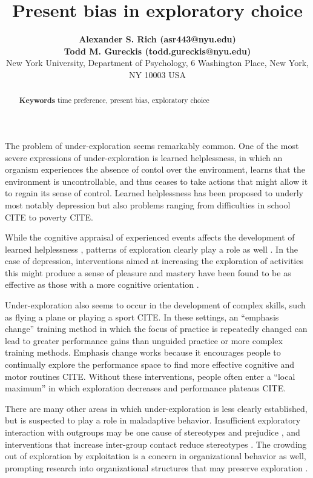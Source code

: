 \documentclass[10pt,letterpaper]{article}
\title{Present bias in exploratory choice}
\author{  {\large \bf Alexander S. Rich (asr443@nyu.edu)} \\ {\large\bf Todd M. Gureckis (todd.gureckis@nyu.edu)}\\
        New York University, Department of Psychology, 6 Washington Place, New York, NY 10003 USA}
\begin{document}
\maketitle

\begin{abstract}

  \textbf{Keywords} time preference, present bias, exploratory choice
\end{abstract}

The problem of under-exploration seems remarkably common. One of the most severe
expressions of under-exploration is learned helplessness, in which an organism
experiences the absence of contol over the environment, learns that the
environment is uncontrollable, and thus ceases to take actions that might allow
it to regain its sense of control. Learned helplessness has been proposed to
underly most notably depression\cite{Abramson1978, Abramson1989} but also
problems ranging from difficulties in school CITE to poverty CITE.

While the cognitive appraisal of experienced events affects the development of
learned helplessness \citep{Abramson1978}, patterns of exploration clearly play
a role as well \citep{Huys2009, Teodorescu2014a}. In the case of depression,
interventions aimed at increasing the exploration of activities this might
produce a sense of pleasure and mastery have been found to be as effective as
those with a more cognitive orientation \citep{Jacobson1996}.

Under-exploration also seems to occur in the development of complex skills, such
as flying a plane or playing a sport CITE. In these settings, an ``emphasis
change'' training method in which the focus of practice is repeatedly changed
can lead to greater performance gains than unguided practice or more complex
training methods. Emphasis change works because it encourages people to
continually explore the performance space to find more effective cognitive and
motor routines CITE. Without these interventions, people often enter a ``local
maximum'' in which exploration decreases and performance plateaus CITE.

There are many other areas in which under-exploration is less clearly
established, but is suspected to play a role in maladaptive behavior.
Insufficient exploratory interaction with outgroups may be one cause of
stereotypes and prejudice \citep{Denrell2005most}, and interventions that
increase inter-group contact reduce stereotypes \citep{Shook2008}. The crowding
out of exploration by exploitation is a concern in organizational behavior as
well\cite{March1991, Levinthal1993}, prompting research into organizational
structures that may preserve exploration \citep{Fang2010}.
\end{document}
